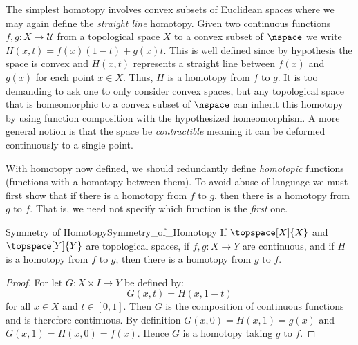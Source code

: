 \documentclass{book}                                                           %
\begin{document}
                \begin{example}
                    \label{ex:Straight_Line_Homotopy_Euc_Spaces}%
                    The simplest homotopy involves convex subsets of Euclidean
                    spaces where we may again define the \textit{straight line}
                    homotopy. Given two continuous functions
                    $f,g:X\rightarrow\mathcal{U}$ from a topological space $X$
                    to a convex subset of $\nspace$ we write
                    $H(x,t)=f(x)(1-t)+g(x)t$. This is well defined since by
                    hypothesis the space is convex and $H(x,t)$ represents a
                    straight line between $f(x)$ and $g(x)$ for each point
                    $x\in{X}$. Thus, $H$ is a homotopy from $f$ to $g$. It is
                    too demanding to ask one to only consider convex spaces, but
                    any topological space that is homeomorphic to a convex
                    subset of $\nspace$ can inherit this homotopy by using
                    function composition with the hypothesized homeomorphism. A
                    more general notion is that the space be
                    \textit{contractible} meaning it can be deformed
                    continuously to a single point.
                \end{example}
                With homotopy now defined, we should redundantly define
                \textit{homotopic} functions (functions with a homotopy between
                them). To avoid abuse of language we must first show that if
                there is a homotopy from $f$ to $g$, then there is a homotopy
                from $g$ to $f$. That is, we need not specify which function is
                the \textit{first} one.
                \begin{ltheorem}{Symmetry of Homotopy}{Symmetry_of_Homotopy}
                    If $\topspace[X]{X}$ and $\topspace[Y]{Y}$ are topological
                    spaces, if $f,g:X\rightarrow{Y}$ are continuous, and if $H$
                    is a homotopy from $f$ to $g$, then there is a homotopy
                    from $g$ to $f$.
                \end{ltheorem}
                \begin{proof}
                    For let $G:X\times{I}\rightarrow{Y}$ be defined by:
                    \begin{equation}
                        G(x,t)=H(x,1-t)
                    \end{equation}
                    for all $x\in{X}$ and $t\in[0,1]$. Then $G$ is the
                    composition of continuous functions and is therefore
                    continuous. By definition $G(x,0)=H(x,1)=g(x)$ and
                    $G(x,1)=H(x,0)=f(x)$. Hence $G$ is a homotopy taking $g$ to
                    $f$.
                \end{proof}
\end{document}
